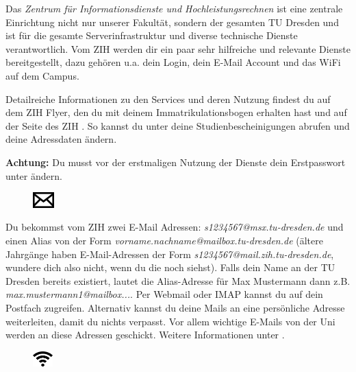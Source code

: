 
Das \textit{Zentrum für Informationsdienste und Hochleistungsrechnen} ist eine zentrale Einrichtung nicht nur unserer Fakultät, sondern der gesamten TU Dresden und ist für die gesamte Serverinfrastruktur und diverse technische Dienste verantwortlich. Vom ZIH werden dir ein paar sehr hilfreiche und relevante Dienste bereitgestellt, dazu gehören u.a. dein Login, dein E-Mail Account und das WiFi auf dem Campus.

Detailreiche Informationen zu den Services und deren Nutzung findest du auf dem ZIH Flyer, den du mit deinem Immatrikulationsbogen erhalten hast und auf der Seite des ZIH . So kannst du unter  deine Studienbescheinigungen abrufen und deine Adressdaten ändern.

\textbf{Achtung:} Du musst vor der erstmaligen Nutzung der Dienste dein Erstpasswort unter  ändern.


\begin{figure}%
  \vspace{-0.4cm}%
  \centering%
  \includegraphics[height=0.6cm]{img/icons/email.pdf}%
  \vspace{-0.4cm}%
\end{figure}

Du bekommst vom ZIH zwei E-Mail Adressen:
\textit{s1234567@msx.tu-dresden.de} und einen Alias von der Form \textit{vorname.nachname@mailbox.tu-dresden.de}
(ältere Jahrgänge haben E-Mail-Adressen der Form \textit{s1234567\allowbreak @mail.zih.tu-dresden.de}, wundere dich also nicht, wenn du die noch siehst).
Falls dein Name an der TU Dresden bereits existiert, lautet die Alias-Adresse für Max Mustermann dann z.B. \textit{max.mustermann1@mailbox...}.
Per Webmail oder IMAP kannst du auf dein Postfach zugreifen.
Alternativ kannst du deine Mails an eine persönliche Adresse weiterleiten, damit du nichts verpasst.
Vor allem wichtige E-Mails von der Uni werden an diese Adressen geschickt. Weitere Informationen unter .


\begin{figure}%
  \vspace{-0.4cm}%
  \centering%
  \includegraphics[height=0.6cm]{img/icons/wifi.pdf}%
  \vspace{-0.4cm}%
\end{figure}


